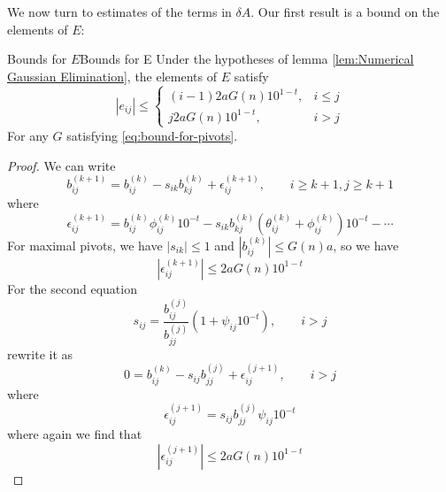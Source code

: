 \documentclass[../main.tex]{subfiles}
\begin{document}
We now turn to estimates of the terms in $\delta A$. Our first result is a bound on the elements of $E$:
\begin{proposition}{Bounds for $E$}{Bounds for E}
	Under the hypotheses of lemma \ref{lem:Numerical Gaussian Elimination}, the elements of $E$ satisfy
	\begin{equation}
		| e_{ij} | \leq
		\begin{cases}
			(i-1) 2a G(n) 10^{1-t}, & i \leq j \\
			j 2a G(n) 10^{1-t},     & i > j
		\end{cases}
	\end{equation}
	For any $G$ satisfying \eqref{eq:bound-for-pivots}.
\end{proposition}
\begin{proof}
	We can write
	\begin{equation} \label{eq:gauss-elimination-coefficients-with-error}
		b_{ij}^{(k+1)} = b_{ij}^{(k)} - s_{ik} b_{kj}^{(k)} + \epsilon_{ij}^{(k+1)}, \qquad i \geq k+1, j \geq k+1
	\end{equation}
	where
	\begin{equation*}
		\epsilon_{ij}^{(k+1)} = b_{ij}^{(k)} \phi_{ij}^{(k)} 10^{-t} - s_{ik} b_{kj}^{(k)} (\theta_{ij}^{(k)} + \phi_{ij}^{(k)}) 10^{-t} - \cdots
	\end{equation*}
	For maximal pivots, we have $| s_{ik} | \leq 1$ and $| b_{ij}^{(k)} | \leq G(n) a$, so we have
	\begin{equation*}
		| \epsilon_{ij}^{(k+1)} | \leq 2 a G(n) 10^{1-t}
	\end{equation*}
	For the second equation
	\begin{equation*}
		s_{ij} = \frac{b_{ij}^{(j)}}{b_{jj}^{(j)}} (1 + \psi_{ij} 10^{-t}), \qquad i > j
	\end{equation*}
	rewrite it as
	\begin{equation*}
		0 = b_{ij}^{(k)} - s_{ij} b_{jj}^{(j)} + \epsilon_{ij}^{(j+1)}, \qquad i > j
	\end{equation*}
	where
	\begin{equation*}
		\epsilon_{ij}^{(j+1)} = s_{ij} b_{jj}^{(j)} \psi_{ij} 10^{-t}
	\end{equation*}
	where again we find that
	\begin{equation*}
		|\epsilon_{ij}^{(j+1)}| \leq 2 a G(n) 10^{1-t}
	\end{equation*}


\end{proof}
\end{document}
